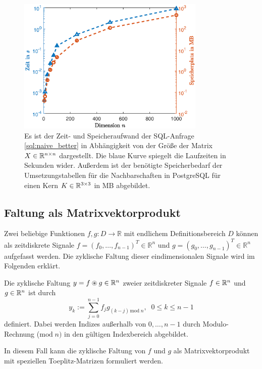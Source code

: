 

\begin{figure}[h]
    \includegraphics[width=0.8\textwidth]{pics/chapters/kap5/data_plot_naive_verb_verb.eps}
    \centering
    \caption[Laufzeiten und Speicherbedarf bei verbesserter Nachbarschaft]{Es ist der Zeit- und Speicheraufwand der SQL-Anfrage \ref{sql:naive_better} in Abhängigkeit von der Größe der Matrix $X \in \mathbb{R}^{n \times n}$ dargestellt. Die blaue Kurve spiegelt die Laufzeiten in Sekunden wider. Außerdem ist der benötigte Speicherbedarf der Umsetzungstabellen für die Nachbarschaften in PostgreSQL für einen Kern $K \in \mathbb{R}^{3 \times 3}$ in MB abgebildet.}
    \label{abb:laufzeit_naive_verb}
\end{figure}

\subsection{Faltung als Matrixvektorprodukt}
\label{abs:conv_using_sparse}
Zwei beliebige Funktionen $f,g: D \rightarrow \mathbb{R}$ mit endlichem Definitionsbereich $D$ können als zeitdiskrete Signale $f=(f_0, \ldots, f_{n-1})^T \in \mathbb{R}^{n}$ und $g=(g_0, \ldots, g_{n-1})^T \in \mathbb{R}^{n}$ aufgefasst werden. %
Die zyklische Faltung dieser eindimensionalen Signale wird im Folgenden erklärt.

\begin{defi}
    \label{def:cycconv}
    Die zyklische Faltung $y=f \circledast g \in \mathbb{R}^{n}$ zweier zeitdiskreter Signale $f \in \mathbb{R}^n$ und $g \in \mathbb{R}^n$ ist durch
    \begin{equation*}
        y_k:=\sum_{j=0}^{n-1} f_j g_{(k-j) \, \mathrm{mod} \; n},  \; \; 0 \leq k \leq n-1
    \end{equation*}
    definiert. Dabei werden Indizes außerhalb von $0, \ldots, n-1$ durch Modulo-Rechnung ($\mathrm{mod} \; n)$ in den gültigen Indexbereich abgebildet.
\end{defi}
In diesem Fall kann die zyklische Faltung von $f$ und $g$ als Matrixvektorprodukt mit speziellen Toeplitz-Matrizen formuliert werden. 

